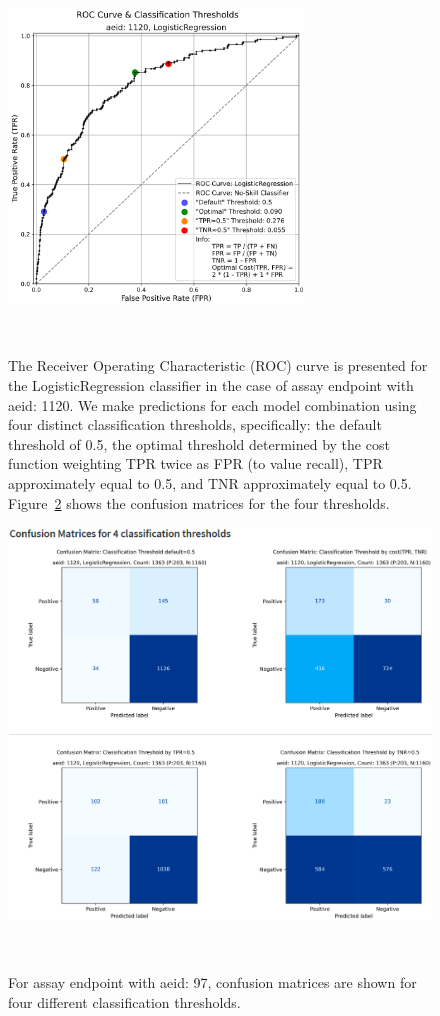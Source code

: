 \begin{figure}[h]
  \centering
  \includegraphics[width=0.7\textwidth]{figures/roc1120.png}
  \caption{The Receiver Operating Characteristic (ROC) curve is presented for the LogisticRegression classifier in the case of assay endpoint with aeid: 1120. We make predictions for each model combination using four distinct classification thresholds, specifically: the default threshold of 0.5, the optimal threshold determined by the cost function weighting TPR twice as FPR (to value recall), TPR approximately equal to 0.5, and TNR approximately equal to 0.5. Figure~\ref{fig:cm1120} shows the confusion matrices for the four thresholds.}
~\label{fig:roc1120}
\end{figure}

\begin{figure}[h]
  \centering
  \includegraphics[width=1.0\textwidth]{figures/cm1120.png}
  \caption{For assay endpoint with aeid: 97, confusion matrices are shown for four different classification thresholds.}
~\label{fig:cm1120}
\end{figure}

